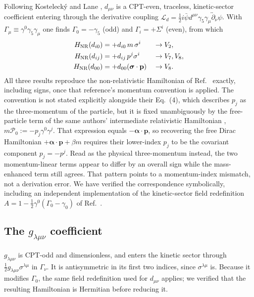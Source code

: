 \documentclass[
  aps,
  prd,
  reprint,
  amsmath,
  amssymb,
  nofootinbib,
  superscriptaddress,
  floatfix
]{revtex4-2}
\newcommand{\sig}{\bm{\sigma}}
\begin{document}
Following Kostelecký and Lane \cite{KosteleckyLane1999}, $d_{\mu\nu}$ is
a CPT-even, traceless, kinetic-sector coefficient entering through the
derivative coupling $\mathcal{L}_d=\tfrac12 i\bar\psi
d^{\mu\nu}\gamma_5\gamma_\mu\overleftrightarrow{\partial}_\nu\psi$. With
$\Gamma_\mu\equiv\gamma^0\gamma_5\gamma_\mu$ one finds $\Gamma_0=-\gamma_5$
(odd) and $\Gamma_i=+\Sigma^i$ (even), from which
\begin{align}
  H_{\rm NR}(d_{i0}) &= +d_{i0}\,m\,\sigma^i          &&\to V_2, \\
  H_{\rm NR}(d_{ij}) &= +d_{ij}\,p^j\sigma^i          &&\to V_7,V_8,\\
  H_{\rm NR}(d_{00}) &= +d_{00}(\sig\cdot\mathbf{p})  &&\to V_8 .
\end{align}
All three results reproduce the non-relativistic Hamiltonian of
Ref.~\cite{KosteleckyLane1999} exactly, including signs, once that
reference's momentum convention is applied. The convention is not stated
explicitly alongside their Eq.~(4), which describes $p_j$ as the
three-momentum of the particle, but it is fixed unambiguously by the
free-particle term of the same authors' intermediate relativistic
Hamiltonian \cite{KosteleckyLane1999b}, $m\mathcal{P}_0 :=
-p_j\gamma^0\gamma^j$. That expression equals $-\bm\alpha\cdot\mathbf p$,
so recovering the free Dirac Hamiltonian $+\bm\alpha\cdot\mathbf p+\beta m$
requires their lower-index $p_j$ to be the covariant component
$p_j=-p^j$. Read as the physical three-momentum instead, the two
momentum-linear terms appear to differ by an overall sign while the
mass-enhanced term still agrees. That pattern points to a momentum-index
mismatch, not a derivation error. We have verified the
correspondence symbolically, including an independent implementation of
the kinetic-sector field redefinition $A=1-\tfrac12\gamma^0(\Gamma_0-\gamma_0)$
of Ref.~\cite{KosteleckyLane1999b}.

\subsection{The \texorpdfstring{$g_{\lambda\mu\nu}$}{g-lambda-mu-nu} coefficient}
\label{sec:gmunu}

$g_{\lambda\mu\nu}$ is CPT-odd and dimensionless, and enters the
kinetic sector through $\tfrac12 g_{\lambda\mu\nu}\sigma^{\lambda\mu}$ in
$\Gamma_\nu$. It is antisymmetric in its first two indices, since
$\sigma^{\lambda\mu}$ is. Because it modifies $\Gamma_0$, the same field
redefinition used for $d_{\mu\nu}$ applies; we verified that the resulting
Hamiltonian is Hermitian before reducing it.
\end{document}
